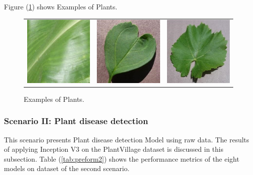 \noindent Figure (\ref{fig:examplePlant}) shows Examples of Plants.
\begin{figure}[H]
  \centering
  \begin{tabular}{ccc}
      \includegraphics[width=4cm]{photos/chapter05/6.jpg} & \includegraphics[width=4cm]{photos/chapter05/7.jpg} & \includegraphics[width=4cm]{photos/chapter05/8.jpg} \\
  \end{tabular}
  \caption{Examples of Plants.}
  \label{fig:examplePlant}
\end{figure}

\subsubsection{Scenario II: Plant disease detection}

This scenario presents Plant disease detection Model using raw data. 
The results of applying Inception V3 on the PlantVillage dataset is discussed 
in this subsection. Table (\ref{tab:preform2}) shows the performance metrics of the eight models 
on dataset of the second scenario.

